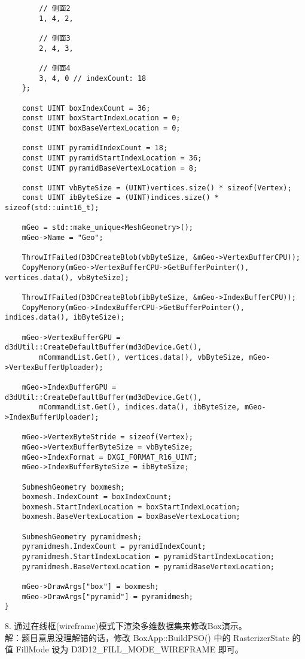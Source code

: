 \begin{lstlisting}
        // 侧面2
        1, 4, 2,

        // 侧面3
        2, 4, 3,

        // 侧面4
        3, 4, 0 // indexCount: 18
    };

    const UINT boxIndexCount = 36;
    const UINT boxStartIndexLocation = 0;
    const UINT boxBaseVertexLocation = 0;

    const UINT pyramidIndexCount = 18;
    const UINT pyramidStartIndexLocation = 36;
    const UINT pyramidBaseVertexLocation = 8;

    const UINT vbByteSize = (UINT)vertices.size() * sizeof(Vertex);
    const UINT ibByteSize = (UINT)indices.size() * sizeof(std::uint16_t);

    mGeo = std::make_unique<MeshGeometry>();
    mGeo->Name = "Geo";

    ThrowIfFailed(D3DCreateBlob(vbByteSize, &mGeo->VertexBufferCPU));
    CopyMemory(mGeo->VertexBufferCPU->GetBufferPointer(), vertices.data(), vbByteSize);

    ThrowIfFailed(D3DCreateBlob(ibByteSize, &mGeo->IndexBufferCPU));
    CopyMemory(mGeo->IndexBufferCPU->GetBufferPointer(), indices.data(), ibByteSize);

    mGeo->VertexBufferGPU = d3dUtil::CreateDefaultBuffer(md3dDevice.Get(),
        mCommandList.Get(), vertices.data(), vbByteSize, mGeo->VertexBufferUploader);

    mGeo->IndexBufferGPU = d3dUtil::CreateDefaultBuffer(md3dDevice.Get(),
        mCommandList.Get(), indices.data(), ibByteSize, mGeo->IndexBufferUploader);

    mGeo->VertexByteStride = sizeof(Vertex);
    mGeo->VertexBufferByteSize = vbByteSize;
    mGeo->IndexFormat = DXGI_FORMAT_R16_UINT;
    mGeo->IndexBufferByteSize = ibByteSize;

    SubmeshGeometry boxmesh;
    boxmesh.IndexCount = boxIndexCount;
    boxmesh.StartIndexLocation = boxStartIndexLocation;
    boxmesh.BaseVertexLocation = boxBaseVertexLocation;

    SubmeshGeometry pyramidmesh;
    pyramidmesh.IndexCount = pyramidIndexCount;
    pyramidmesh.StartIndexLocation = pyramidStartIndexLocation;
    pyramidmesh.BaseVertexLocation = pyramidBaseVertexLocation;

    mGeo->DrawArgs["box"] = boxmesh;
    mGeo->DrawArgs["pyramid"] = pyramidmesh;
}
\end{lstlisting}

\begin{flushleft}
8. 通过在线框(wireframe)模式下渲染多维数据集来修改Box演示。\\
解：题目意思没理解错的话，修改 BoxApp::BuildPSO() 中的 RasterizerState 的值
FillMode 设为 D3D12\_FILL\_MODE\_WIREFRAME 即可。
\end{flushleft}

